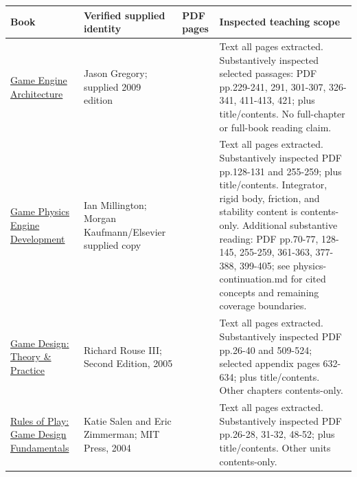 {\def\LTcaptype{none} %
\begin{longtable}[]{@{}
  >{\raggedright\arraybackslash}p{}
  >{\raggedright\arraybackslash}p{}
  >{\raggedleft\arraybackslash}p{}
  >{\raggedright\arraybackslash}p{}@{}}
\toprule\noalign{}
\begin{minipage}[b]{\linewidth}\raggedright
Book
\end{minipage} & \begin{minipage}[b]{\linewidth}\raggedright
Verified supplied identity
\end{minipage} & \begin{minipage}[b]{\linewidth}\raggedleft
PDF pages
\end{minipage} & \begin{minipage}[b]{\linewidth}\raggedright
Inspected teaching scope
\end{minipage} \\
\midrule\noalign{}
\endhead
\bottomrule\noalign{}
\endlastfoot
\href{/Users/swayamsingal/Library/Mobile\%20Documents/com~apple~CloudDocs/Game/Game\%20Engine\%20Architecture.pdf}{Game Engine Architecture} & Jason Gregory; supplied 2009 edition & 853 & Text all pages extracted. Substantively inspected selected passages: PDF pp.229-241, 291, 301-307, 326-341, 411-413, 421; plus title/contents. No full-chapter or full-book reading claim. \\
\href{/Users/swayamsingal/Library/Mobile\%20Documents/com~apple~CloudDocs/Game/Game\%20Physics\%20Engine\%20Development.pdf}{Game Physics Engine Development} & Ian Millington; Morgan Kaufmann/Elsevier supplied copy & 481 & Text all pages extracted. Substantively inspected PDF pp.128-131 and 255-259; plus title/contents. Integrator, rigid body, friction, and stability content is contents-only. Additional substantive reading: PDF pp.70-77, 128-145, 255-259, 361-363, 377-388, 399-405; see physics-continuation.md for cited concepts and remaining coverage boundaries. \\
\href{/Users/swayamsingal/Library/Mobile\%20Documents/com~apple~CloudDocs/Game/2-game-design-theory-and-practice.pdf}{Game Design: Theory \& Practice} & Richard Rouse III; Second Edition, 2005 & 723 & Text all pages extracted. Substantively inspected PDF pp.26-40 and 509-524; selected appendix pages 632-634; plus title/contents. Other chapters contents-only. \\
\href{/Users/swayamsingal/Library/Mobile\%20Documents/com~apple~CloudDocs/Game/Game\%20Design\%20Fundamentals\%20Rules\%20of\%20Play.pdf}{Rules of Play: Game Design Fundamentals} & Katie Salen and Eric Zimmerman; MIT Press, 2004 & 694 & Text all pages extracted. Substantively inspected PDF pp.26-28, 31-32, 48-52; plus title/contents. Other units contents-only. \\
\end{longtable}
}

